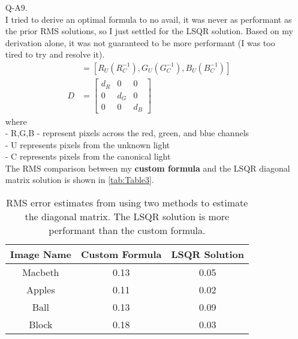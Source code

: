 \documentclass[12pt]{report}
\begin{document}
\begin{enumerate}
    \FloatBarrier 

    \item[Q-A9.]
    \ \\
    I tried to derive an optimal formula to no avail, it was never as performant as the prior RMS solutions, so I just settled for the LSQR solution. Based on my
    derivation alone, it was not guaranteed to be more performant (I was too tired to try and resolve it).
    \begin{align*}
    [d_R,d_G,d_B] &= [R_U(R_C^{-1}), G_U(G_C^{-1}), B_U(B_C^{-1})] \\
    D &= 
    \begin{bmatrix}
    d_R & 0 & 0 \\
    0 & d_G & 0 \\
    0 & 0 & d_B
    \end{bmatrix}
    \end{align*}
    where \\
    - R,G,B - represent pixels across the red, green, and blue channels \\
    - U represents pixels from the unknown light \\
    - C represents pixels from the canonical light \\
    The RMS comparison between my \textbf{custom formula} and the LSQR diagonal matrix solution is shown in \autoref{tab:Table3}.

    \begin{table}[h!]
    \begin{center}
    \begin{tabular}{ | c | c | c | } 
        \hline
        Image Name & Custom Formula & LSQR Solution \\ 
        \hline \hline
        Macbeth & 0.13 & 0.05 \\ 
        Apples & 0.11 & 0.02 \\ 
        Ball & 0.13 & 0.09 \\ 
        Block & 0.18 & 0.03 \\ 
        \hline
    \end{tabular}
    \caption{RMS error estimates from using two methods to estimate the diagonal matrix. The LSQR solution is more performant than the custom formula.}
    \label{tab:Table3}
    \end{center}
    \end{table}



\end{enumerate}
\end{document}
